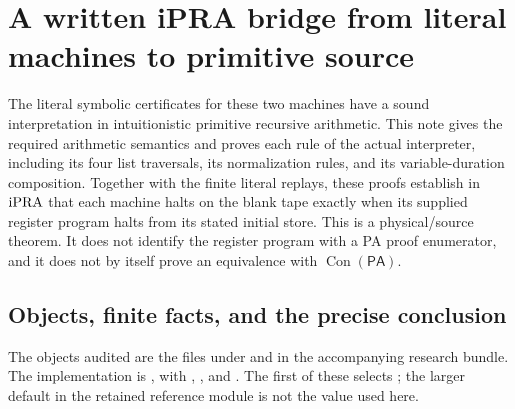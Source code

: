 \section{A written iPRA bridge from literal machines to primitive source}
\label{sec:physical-ipra}
\providecommand{\Run}{\operatorname{Run}}
\providecommand{\enc}{\operatorname{enc}}
\providecommand{\rev}{\operatorname{rev}}
\providecommand{\Val}{\operatorname{Val}}
\providecommand{\Valid}{\operatorname{Valid}}



The literal symbolic certificates for these two machines have a sound
interpretation in intuitionistic primitive recursive arithmetic.  This note
gives the required arithmetic semantics and proves each rule of the actual
interpreter, including its four list traversals, its normalization rules,
and its variable-duration composition.  Together with the finite literal
replays, these proofs establish in $\mathrm{iPRA}$ that each machine halts on the
blank tape exactly when its supplied register program halts from its stated
initial store.  This is a physical/source theorem.  It does not identify the
register program with a PA proof enumerator, and it does not by itself prove
an equivalence with $\operatorname{Con}(\mathsf{PA})$.


\subsection{Objects, finite facts, and the precise conclusion}

The objects audited are the files under
 and  in the
accompanying research bundle.  The implementation is
, with
,
, and .
The first of these selects ; the larger default in
the retained reference module is not the value used here.


